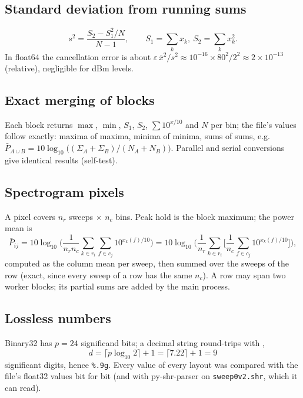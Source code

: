 \documentclass[11pt,a4paper]{article}
\newcommand{\code}[1]{\texttt{#1}}
\begin{document}
\subsection{Standard deviation from running sums}
\begin{equation}s^2=\frac{S_2-S_1^2/N}{N-1},\qquad S_1=\sum_k x_k,\ S_2=\sum_k x_k^2 .\end{equation}
In float64 the cancellation error is about $\varepsilon\,\bar x^2/s^2\approx 10^{-16}\times 80^2/2^2\approx
2\times10^{-13}$ (relative), negligible for dBm levels.
\subsection{Exact merging of blocks}
Each block returns $\max$, $\min$, $S_1$, $S_2$, $\sum 10^{x/10}$ and $N$ per bin; the file's values follow
exactly: maxima of maxima, minima of minima, sums of sums, e.g.
$\bar P_{A\cup B}=10\log_{10}\big((\Sigma_A+\Sigma_B)/(N_A+N_B)\big)$. Parallel and serial conversions give
identical results (self-test).
\subsection{Spectrogram pixels}
A pixel covers $n_r$ sweeps $\times$ $n_c$ bins. Peak hold is the block maximum; the power mean is
\begin{equation}
\bar P_{ij}=10\log_{10}\Big(\frac{1}{n_r n_c}\sum_{k\in r_i}\sum_{f\in c_j}10^{x_k(f)/10}\Big)
=10\log_{10}\Big(\frac{1}{n_r}\sum_{k\in r_i}\Big[\frac1{n_c}\sum_{f\in c_j}10^{x_k(f)/10}\Big]\Big),
\end{equation}
computed as the column mean per sweep, then summed over the sweeps of the row (exact, since every sweep of a
row has the same $n_c$). A row may span two worker blocks; its partial sums are added by the main process.
\subsection{Lossless numbers}
Binary32 has $p=24$ significand bits; a decimal string round-trips with \cite{r5},\cite{r16}
\begin{equation}d=\lceil p\log_{10}2\rceil+1=\lceil 7.22\rceil+1=9\end{equation}
significant digits, hence \code{\%.9g}. Every value of every layout was compared with the file's float32
values bit for bit (and with py-shr-parser \cite{r10} on \code{sweep0v2.shr}, which it can read).
\end{document}
